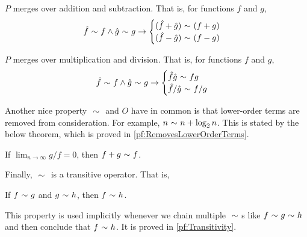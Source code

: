 \begin{theorem}
\label{thm:MergesOverArithmeticAdd}
	$P$ merges over addition and subtraction. That is, for functions $f$ and $g$,
	\begin{align*}
	\hat{f} \ \mathtt{\sim}\  f \land \hat{g} \ \mathtt{\sim}\  g \rightarrow \begin{cases}
		(\hat{f} + \hat{g}) \ \mathtt{\sim}\  (f + g)\\
		(\hat{f} - \hat{g}) \ \mathtt{\sim}\  (f - g)
	\end{cases}
	\end{align*}
\end{theorem}

\begin{theorem}
\label{thm:MergesOverArithmeticMultiply}
	$P$ merges over multiplication and division. That is, for functions $f$ and $g$,
	\begin{align*}
	\hat{f} \ \mathtt{\sim}\  f \land \hat{g} \ \mathtt{\sim}\  g \rightarrow \begin{cases}
	\hat{f}\hat{g} \ \mathtt{\sim}\  fg\\
	\hat{f} / \hat{g} \ \mathtt{\sim}\  f / g
	\end{cases}
	\end{align*}
\end{theorem}

Another nice property $\ \mathtt{\sim}\ $ and $O$ have in common is that lower-order terms are removed from consideration. For example, $n \ \mathtt{\sim}\  n + \log_2 n$. This is stated by the below theorem, which is proved in \ref{pf:RemovesLowerOrderTerms}.

\begin{theorem}
\label{thm:RemovesLowerOrderTerms}
	If $\lim_{n \to \infty} g / f = 0$, then $f + g \ \mathtt{\sim}\  f$.
\end{theorem}

Finally, $\ \mathtt{\sim}\ $ is a transitive operator. That is,

\begin{theorem}
\label{thm:Transitivity}
	If $f \ \mathtt{\sim}\  g$ and $g \ \mathtt{\sim}\  h$, then $f \ \mathtt{\sim}\  h$.
\end{theorem}

This property is used implicitly whenever we chain multiple $\ \mathtt{\sim}\ $s like $f \ \mathtt{\sim}\  g \ \mathtt{\sim}\  h$ and then conclude that $f \ \mathtt{\sim}\  h$. It is proved in \ref{pf:Transitivity}.